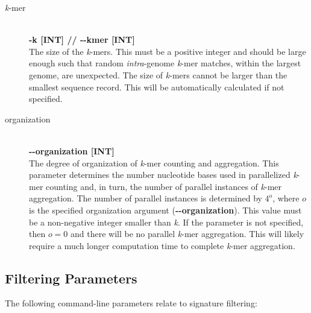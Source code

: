 \documentclass[a4paper,10pt]{article}
\begin{document}
\begin{description}

  \item[\textit{k}-mer] \hfill \\
  \textbf{-k [INT] // -{}-kmer [INT]} \hfill \\
  The size of the \textit{k}-mers. This must be a positive integer and should be large enough such that random \textit{intra}-genome \textit{k}-mer matches, within the largest genome, are unexpected. The size of \textit{k}-mers cannot be larger than the smallest sequence record. This will be automatically calculated if not specified.
  
  \item[organization] \hfill \\
  \textbf{-{}-organization [INT]} \hfill \\
  The degree of organization of \textit{k}-mer counting and aggregation. This parameter determines the number nucleotide bases used in parallelized \textit{k}-mer counting and, in turn, the number of parallel instances of \textit{k}-mer aggregation. The number of parallel instances is determined by \(4^{o}\), where \(o\) is the specified organization argument (\textbf{\mbox{-{}-organization}}). This value must be a non-negative integer smaller than \textit{k}. If the parameter is not specified, then \(o = 0\) and there will be no parallel \textit{k}-mer aggregation. This will likely require a much longer computation time to complete \textit{k}-mer aggregation.
  
\end{description}

\subsection{Filtering Parameters}

The following command-line parameters relate to signature filtering:
\end{document}
